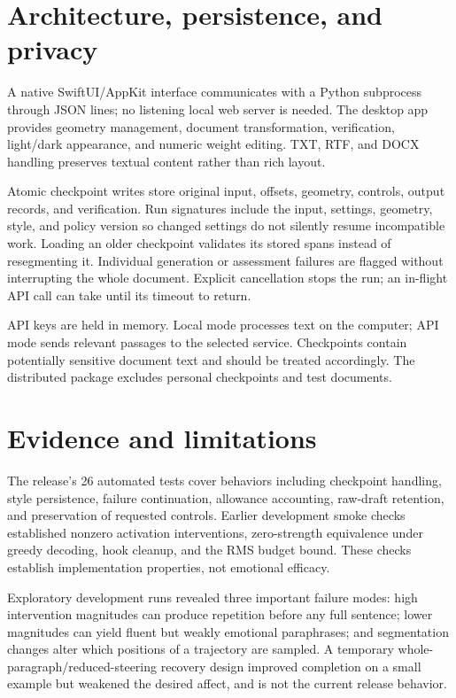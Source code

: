 \documentclass[manuscript,screen,nonacm]{acmart}
\begin{document}
\section{Architecture, persistence, and
privacy}\label{architecture-persistence-and-privacy}

A native SwiftUI/AppKit interface communicates with a Python subprocess
through JSON lines; no listening local web server is needed. The desktop
app provides geometry management, document transformation, verification,
light/dark appearance, and numeric weight editing. TXT, RTF, and DOCX
handling preserves textual content rather than rich layout.

Atomic checkpoint writes store original input, offsets, geometry,
controls, output records, and verification. Run signatures include the
input, settings, geometry, style, and policy version so changed settings
do not silently resume incompatible work. Loading an older checkpoint
validates its stored spans instead of resegmenting it. Individual
generation or assessment failures are flagged without interrupting the
whole document. Explicit cancellation stops the run; an in-flight API
call can take until its timeout to return.

API keys are held in memory. Local mode processes text on the computer;
API mode sends relevant passages to the selected service. Checkpoints
contain potentially sensitive document text and should be treated
accordingly. The distributed package excludes personal checkpoints and
test documents.

\section{Evidence and limitations}\label{evidence-and-limitations}

The release's 26 automated tests cover behaviors including checkpoint
handling, style persistence, failure continuation, allowance accounting,
raw-draft retention, and preservation of requested controls. Earlier
development smoke checks established nonzero activation interventions,
zero-strength equivalence under greedy decoding, hook cleanup, and the
RMS budget bound. These checks establish implementation properties, not
emotional efficacy.

Exploratory development runs revealed three important failure modes:
high intervention magnitudes can produce repetition before any full
sentence; lower magnitudes can yield fluent but weakly emotional
paraphrases; and segmentation changes alter which positions of a
trajectory are sampled. A temporary whole-paragraph/reduced-steering
recovery design improved completion on a small example but weakened the
desired affect, and is not the current release behavior.
\end{document}
